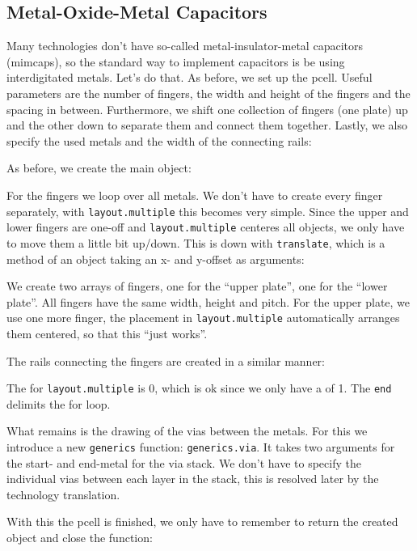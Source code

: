 \subsection{Metal-Oxide-Metal Capacitors}
Many technologies don't have so-called metal-insulator-metal capacitors (mimcaps), so the standard way to implement capacitors is be using interdigitated metals.
Let's do that. As before, we set up the pcell. Useful parameters are the number of fingers, the width and height of the fingers and the spacing in between.
Furthermore, we shift one collection of fingers (one plate) up and the other down to separate them and connect them together. Lastly, we also specify the used
metals and the width of the connecting rails:

As before, we create the main object:

For the fingers we loop over all metals. We don't have to create every finger separately, with \lstinline!layout.multiple! this becomes very simple. Since the upper
and lower fingers are one-off and \lstinline!layout.multiple! centeres all objects, we only have to move them a little bit up/down. This is down with
\lstinline!translate!, which is a method of an object taking an x- and y-offset as arguments:

We create two arrays of fingers, one for the \enquote{upper plate}, one for the \enquote{lower plate}. All fingers have the same width, height and pitch. For the
upper plate, we use one more finger, the placement in \lstinline!layout.multiple! automatically arranges them centered, so that this \enquote{just works}.

The rails connecting the fingers are created in a similar manner:

The  for \lstinline!layout.multiple! is \num{0}, which is ok since we only have a  of \num{1}. The \lstinline!end! delimits the for loop.

What remains is the drawing of the vias between the metals. For this we introduce a new \lstinline!generics! function: \lstinline!generics.via!. It takes two
arguments for the start- and end-metal for the via stack. We don't have to specify the individual vias between each layer in the stack, this is resolved later by the
technology translation.

With this the pcell is finished, we only have to remember to return the created object and close the function:


